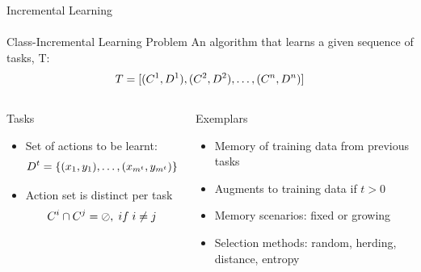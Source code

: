 \documentclass[aspectratio=169, xcolor=dvipsnames]{beamer}
\begin{document}
\begin{frame}{Incremental Learning}
      \framesubtitle{}%
      
      \begin{block}{Class-Incremental Learning Problem}
            \small An algorithm that learns a given sequence of tasks, T:
            \begin{equation}
            \centering
            T = [ (C^1, D^1), (C^2, D^2), \ldots ,(C^n, D^n) ]
            \end{equation}
      \end{block}
      \vfill
      \begin{columns}
      
      \begin{block}{Tasks}
            \small
            \begin{itemize}
            \item Set of actions to be learnt:
            \begin{equation}
            \centering
            D^t = \{ (x_1, y_1), \ldots, (x_{m^t}, y_{m^t}) \}
            \end{equation}
            \item Action set is distinct per task
            \begin{equation}
            \centering
            C^i \cap C^j = \oslash, \; if \; i \ne j
            \end{equation}
            \end{itemize}
      \end{block}
      
      
      \begin{block}{Exemplars}
            \small
            \begin{itemize}
            \item Memory of training data from previous tasks
            \item Augments to training data if $t > 0$
            \item Memory scenarios: fixed or growing
            \item Selection methods: random, herding, distance, entropy
            \end{itemize}
      \end{block}
      
      \end{columns}
\end{frame}
\end{document}

